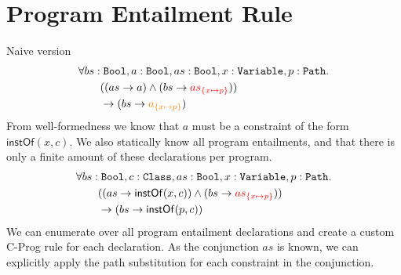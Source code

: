 \documentclass{article}          %
\begin{document}
\newpage
\section{Program Entailment Rule}
\begin{mathpar}
\end{mathpar}
Naive version
\begin{align*}
&\forall bs:\mathtt{Bool}, a:\mathtt{Bool}, as:\mathtt{Bool}, x:\mathtt{Variable}, p:\mathtt{Path}.\\
&\hspace{2em} ((as \rightarrow a) \land (bs \rightarrow {\color{red} as_{\{x \mapsto p\}}}))\\
&\hspace{2em} \rightarrow (bs \rightarrow {\color{orange} a_{\{x \mapsto p\}}})
\end{align*}
%
From well-formedness we know that $a$ must be a constraint of the form $\mathsf{instOf}(x,c)$.
We also statically know all program entailments, and that there is only a finite amount of these declarations per program.
\begin{align*}
&\forall bs:\mathtt{Bool}, c:\mathtt{Class}, as:\mathtt{Bool}, x:\mathtt{Variable}, p:\mathtt{Path}.\\
&\hspace{2em} ((as \rightarrow \mathsf{instOf}(x,c)) \land (bs \rightarrow {\color{red} as_{\{x \mapsto p\}}}))\\
&\hspace{2em} \rightarrow (bs \rightarrow \mathsf{instOf}(p,c))
\end{align*}
%
We can enumerate over all program entailment declarations and create a custom C-Prog rule for each declaration.
As the conjunction $as$ is known, we can explicitly apply the path substitution for each constraint in the conjunction.
\end{document}
